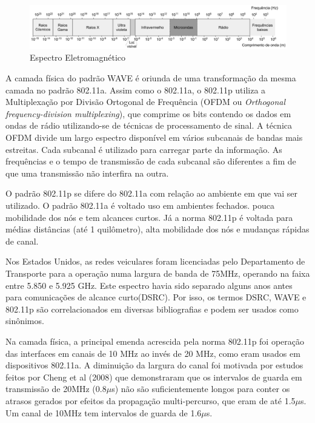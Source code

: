 \documentclass[
12pt,				%
openright,			%
oneside,			%
a4paper,			%
brazil,				%
]{abntex2}
\begin{document}
	\begin{figure} [H]
		\centering
		\includegraphics[scale=.4]{figuras/cap3/20EspectroEletromagnetico}
		\caption{\label{fig_20}Espectro Eletromagnético}
	\end{figure}
	
	\par A camada física do padrão WAVE é oriunda de uma transformação da mesma camada no padrão 802.11a. Assim como o 802.11a, o 802.11p utiliza a Multiplexação por Divisão Ortogonal de Frequência (OFDM ou \textit{Orthogonal frequency-division multiplexing}), que comprime os bits contendo os dados em ondas de rádio utilizando-se de técnicas de processamento de sinal. A técnica OFDM divide um largo espectro disponível em vários subcanais de bandas mais estreitas. Cada subcanal é utilizado para carregar parte da informação. As frequências e o tempo de transmissão de cada subcanal são diferentes a fim de que uma transmissão não interfira na outra. 
	
	\par O padrão 802.11p se difere do 802.11a com relação ao ambiente em que vai ser utilizado. O padrão 802.11a é voltado uso em ambientes fechados. pouca mobilidade dos nós e tem alcances curtos. Já a norma 802.11p é voltada para médias distâncias (até 1 quilômetro), alta mobilidade dos nós e mudanças rápidas de canal.
	
	\par Nos Estados Unidos, as redes veiculares foram licenciadas pelo Departamento de Transporte para a operação numa largura de banda de 75MHz, operando na faixa entre 5.850 e 5.925 GHz. Este espectro havia sido separado alguns anos antes para comunicações de alcance curto(DSRC). Por isso, os termos DSRC, WAVE e 802.11p são correlacionados em diversas bibliografias e podem ser usados como sinônimos.
	
	\par Na camada física, a principal emenda acrescida pela norma 802.11p foi operação das interfaces em canais de 10 MHz ao invés de 20 MHz, como eram usados em dispositivos 802.11a. A diminuição da largura do canal foi motivada por estudos feitos por Cheng et al (2008) que demonstraram que os intervalos de guarda em transmissão de 20MHz (0.8$\mu$s) não são suficientemente longos para conter os atrasos gerados por efeitos da propagação multi-percurso, que eram de até 1.5$\mu$s. Um canal de 10MHz tem intervalos de guarda de 1.6$\mu$s. 
	
\end{document}
